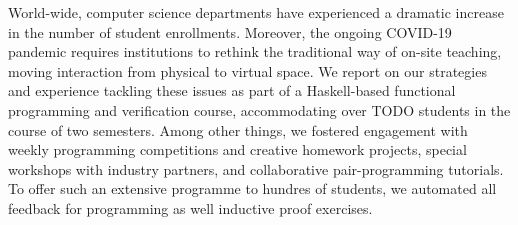World-wide, computer science departments have experienced a dramatic increase in the number of student enrollments.
Moreover, the ongoing COVID-19 pandemic requires institutions to rethink the traditional way of on-site teaching,
moving interaction from physical to virtual space.
We report on our strategies and experience tackling these issues
as part of a Haskell-based functional programming and verification course,
accommodating  over TODO students in the course of two semesters.
Among other things,
we fostered engagement with weekly programming competitions
and creative homework projects,
special workshops with industry partners,
and collaborative pair-programming tutorials.
To offer such an extensive programme to hundres of students,
we automated all feedback for programming as well
inductive proof exercises.

